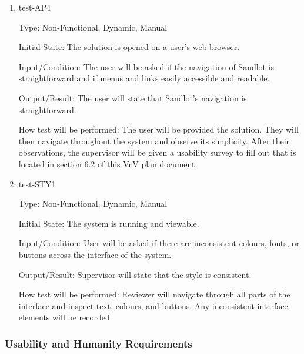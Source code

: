 \documentclass[12pt, titlepage]{article}
\begin{document}
\begin{enumerate}
\item{test-AP4\\}

Type: Non-Functional, Dynamic, Manual
					
Initial State: The solution is opened on a user's web browser.
					
Input/Condition: The user will be asked if the navigation of Sandlot is straightforward 
and if menus and links easily accessible and readable.
					
Output/Result: The user will state that Sandlot's navigation is straightforward.
					
How test will be performed: The user will be provided the solution. They will then 
navigate throughout the system and observe its simplicity. After their observations, 
the supervisor will be given a usability survey to fill out that is located in 
section 6.2 of this VnV plan document.

\item{test-STY1\\}

Type: Non-Functional, Dynamic, Manual
					
Initial State: The system is running and viewable.
					
Input/Condition: User will be asked if there are inconsistent colours,
fonts, or buttons across the interface of the system.
					
Output/Result: Supervisor will state that the style is consistent.
					
How test will be performed: Reviewer will navigate through all parts
of the interface and inspect text, colours, and buttons. Any 
inconsistent interface elements will be recorded. 

\end{enumerate}

\subsubsection{Usability and Humanity Requirements}
\end{document}
